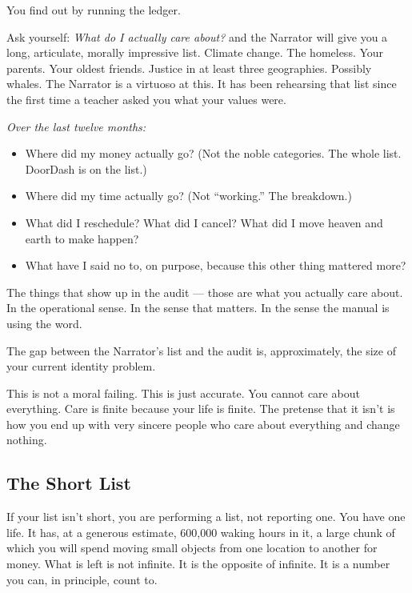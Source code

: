 \documentclass[11pt, letterpaper]{article}
\begin{document}
You find out by running the ledger.

Ask yourself: \textit{What do I actually care about?} and the Narrator will give you a long, articulate, morally impressive list. Climate change. The homeless. Your parents. Your oldest friends. Justice in at least three geographies. Possibly whales. The Narrator is a virtuoso at this. It has been rehearsing that list since the first time a teacher asked you what your values were.


\textit{Over the last twelve months:}

\begin{itemize}[leftmargin=1.6em, itemsep=2pt, topsep=4pt]
  \item Where did my money actually go? \textnormal{(Not the noble categories. The whole list. DoorDash is on the list.)}
  \item Where did my time actually go? \textnormal{(Not ``working.'' The breakdown.)}
  \item What did I reschedule? What did I cancel? What did I move heaven and earth to make happen?
  \item What have I said no to, on purpose, because this other thing mattered more?
\end{itemize}

\begin{fieldbox}
The things that show up in the audit --- those are what you actually care about. In the operational sense. In the sense that matters. In the sense the manual is using the word.

The gap between the Narrator's list and the audit is, approximately, the size of your current identity problem.
\end{fieldbox}

This is not a moral failing. This is just accurate. You cannot care about everything. Care is finite because your life is finite. The pretense that it isn't is how you end up with very sincere people who care about everything and change nothing.

\subsection{The Short List}

If your list isn't short, you are performing a list, not reporting one. You have one life. It has, at a generous estimate, 600{,}000 waking hours in it, a large chunk of which you will spend moving small objects from one location to another for money. What is left is not infinite. It is the opposite of infinite. It is a number you can, in principle, count to.
\end{document}
